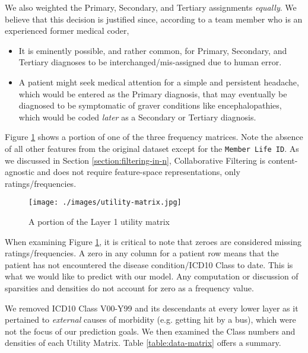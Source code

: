 \documentclass[twoside,11pt]{article}
\begin{document}
{We also weighted the Primary, Secondary, and Tertiary assignments \textit{equally}. We believe that this decision is justified since, according to a team member who is an experienced former medical coder,
\begin{itemize}
  \item It is eminently possible, and rather common, for Primary, Secondary, and Tertiary diagnoses to be interchanged/mis-assigned due to human error.
  \item A patient might seek medical attention for a simple and persistent headache, which would be entered as the Primary diagnosis, that may eventually be diagnosed to be symptomatic of graver conditions like encephalopathies, which would be coded \textit{later} as a Secondary or Tertiary diagnosis.
\end{itemize}

Figure \ref{fig:utility-matrix} shows a portion of one of the three frequency matrices. Note the absence of all other features from the original dataset except for the \texttt{Member Life ID}. As we discussed in Section \ref{section:filtering-in-n}, Collaborative Filtering is content-agnostic and does not require feature-space representations, only ratings/frequencies.

\begin{figure}[H]
	\begin{adjustwidth}{-4em}{}
		\texttt{[image: ./images/utility-matrix.jpg]}
	\end{adjustwidth}
	\caption{A portion of the Layer 1 utility matrix}
	\label{fig:utility-matrix}
\end{figure}

When examining Figure \ref{fig:utility-matrix}, it is critical to note that zeroes are considered missing ratings/frequencies. A zero in any column for a patient row means that the patient has not encountered the disease condition/ICD10 Class to date. This is what we would like to predict with our model. Any computation or discussion of sparsities and densities do not account for zero as a frequency value.

We removed ICD10 Class V00-Y99 and its descendants at every lower layer as it pertained to \textit{external} causes of morbidity (e.g. getting hit by a bus), which were not the focus of our prediction goals. We then examined the Class numbers and densities of each Utility Matrix. Table \ref{table:data-matrix} offers a summary.

}
\end{document}
